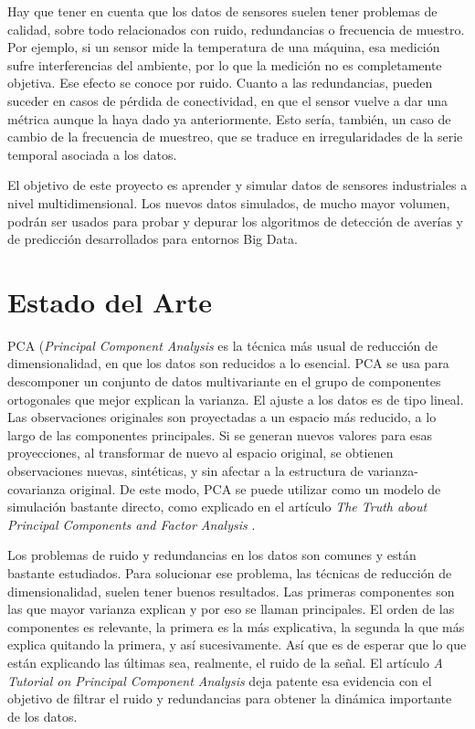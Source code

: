 \documentclass[11pt,spanish,listoffigures,listoftables]{tfgetsinf}
\begin{document}
Hay que tener en cuenta que los datos de sensores suelen tener problemas de calidad, sobre todo relacionados con ruido, redundancias o frecuencia de muestro. Por ejemplo, si un sensor mide la temperatura de una máquina, esa medición sufre interferencias del ambiente, por lo que la medición no es completamente objetiva. Ese efecto se conoce por ruido. Cuanto a las redundancias, pueden suceder en casos de pérdida de conectividad, en que el sensor vuelve a dar una métrica aunque la haya dado ya anteriormente. Esto sería, también, un caso de cambio de la frecuencia de muestreo, que se traduce en irregularidades de la serie temporal asociada a los datos. 

El objetivo de este proyecto es aprender y simular datos de sensores industriales a nivel multidimensional. Los nuevos datos simulados, de mucho mayor volumen, podrán ser usados para probar y depurar los algoritmos de detección de averías y de predicción desarrollados para entornos Big Data. 


\chapter{Estado del Arte}
PCA ({\em Principal Component Analysis} es la técnica más usual de reducción de dimensionalidad, en que los datos son reducidos a lo esencial. PCA se usa para descomponer un conjunto de datos multivariante en el grupo de componentes ortogonales que mejor explican la varianza. El ajuste a los datos es de tipo lineal. Las observaciones originales son proyectadas a un espacio más reducido, a lo largo de las componentes principales. Si se generan nuevos valores para esas proyecciones, al transformar de nuevo al espacio original, se obtienen observaciones nuevas, sintéticas, y sin afectar a la estructura de varianza-covarianza original. De este modo, PCA se puede utilizar como un modelo de simulación bastante directo, como explicado en el artículo {\em The Truth about Principal Components and Factor Analysis} \cite{light}.

Los problemas de ruido y redundancias en los datos son comunes y están bastante estudiados. Para solucionar ese problema, las técnicas de reducción de dimensionalidad, suelen tener buenos resultados. Las primeras componentes son las que mayor varianza explican y por eso se llaman principales. El orden de las componentes es relevante, la primera es la más explicativa, la segunda la que más explica quitando la primera, y así sucesivamente. Así que es de esperar que lo que están explicando las últimas sea, realmente, el ruido de la señal. El artículo \textit{A Tutorial on Principal Component Analysis} \cite{shlens} deja patente esa evidencia con el objetivo de filtrar el ruido y redundancias para obtener la dinámica importante de los datos.
\end{document}
